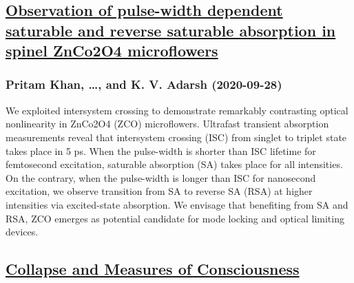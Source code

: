 \subsection*{\href{http://arxiv.org/abs/2009.13226v1}{Observation of pulse-width dependent saturable and reverse saturable  absorption in spinel ZnCo2O4 microflowers}}
\subsubsection*{Pritam Khan, \dots, and K. V. Adarsh (2020-09-28)}
We exploited intersystem crossing to demonstrate remarkably contrasting
optical nonlinearity in ZnCo2O4 (ZCO) microflowers. Ultrafast transient
absorption measurements reveal that intersystem crossing (ISC) from singlet to
triplet state takes place in 5 ps. When the pulse-width is shorter than ISC
lifetime for femtosecond excitation, saturable absorption (SA) takes place for
all intensities. On the contrary, when the pulse-width is longer than ISC for
nanosecond excitation, we observe transition from SA to reverse SA (RSA) at
higher intensities via excited-state absorption. We envisage that benefiting
from SA and RSA, ZCO emerges as potential candidate for mode locking and
optical limiting devices.

\subsection*{\href{http://arxiv.org/abs/2009.13224v1}{Collapse and Measures of Consciousness}}
